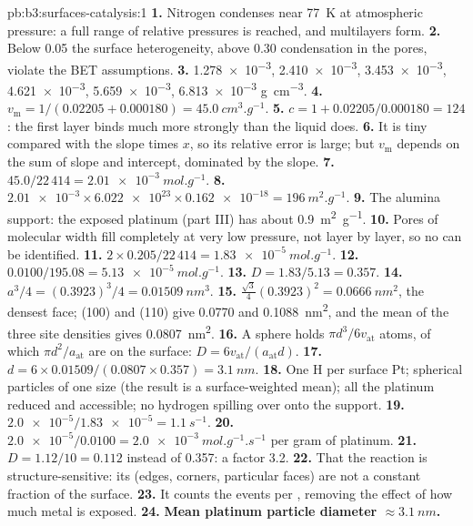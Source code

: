\begin{solution}{pb:b3:surfaces-catalysis:1}
\textbf{1.} Nitrogen condenses near \qty{77}{K} at atmospheric pressure: a full range of
relative pressures is reached, and multilayers form.
\textbf{2.} Below 0.05 the surface heterogeneity, above 0.30 condensation in the
pores, violate the BET assumptions.
\textbf{3.} \num{1.278e-3}, \num{2.410e-3}, \num{3.453e-3}, \num{4.621e-3}, \num{5.659e-3}, \num{6.813e-3} \unit{g.cm^{-3}}.
\textbf{4.} $v_{\mathrm m} = 1/(0.02205 + 0.000180) = \qty{45.0}{cm^3.g^{-1}}$.
\textbf{5.} $c = 1 + 0.02205/0.000180 = 124$: the first layer binds much more strongly than
the liquid does.
\textbf{6.} It is tiny compared with the slope times $x$, so its relative error is large;
but $v_{\mathrm m}$ depends on the sum of slope and intercept, dominated by the slope.
\textbf{7.} $45.0/22\,414 = \qty{2.01e-3}{mol.g^{-1}}$.
\textbf{8.} $\num{2.01e-3} \times \num{6.022e23} \times \num{0.162e-18} = \qty{196}{m^2.g^{-1}}$.
\textbf{9.} The alumina support: the exposed platinum (part III) has about \qty{0.9}{m^2.g^{-1}}.
\textbf{10.} Pores of molecular width fill completely at very low pressure, not layer
by layer, so no  can be identified.
\textbf{11.} $2 \times 0.205/22\,414 = \qty{1.83e-5}{mol.g^{-1}}$.
\textbf{12.} $0.0100/195.08 = \qty{5.13e-5}{mol.g^{-1}}$.
\textbf{13.} $D = 1.83/5.13 = 0.357$.
\textbf{14.} $a^3/4 = (0.3923)^3/4 = \qty{0.01509}{nm^3}$.
\textbf{15.} $\frac{\sqrt3}{4}(0.3923)^2 = \qty{0.0666}{nm^2}$, the densest face; (100) and (110) give 0.0770 and
\qty{0.1088}{nm^2}, and the mean of the three site densities gives \qty{0.0807}{nm^2}.
\textbf{16.} A sphere holds $\pi d^3/6v_{\mathrm{at}}$ atoms, of which $\pi d^2/a_{\mathrm{at}}$ are on the surface:
$D = 6v_{\mathrm{at}}/(a_{\mathrm{at}}d)$.
\textbf{17.} $d = 6 \times 0.01509/(0.0807 \times 0.357) = \qty{3.1}{nm}$.
\textbf{18.} One H per surface Pt; spherical particles of one size (the result is a
surface-weighted mean); all the platinum reduced and accessible; no hydrogen
spilling over onto the support.
\textbf{19.} $\num{2.0e-5}/\num{1.83e-5} = \qty{1.1}{s^{-1}}$.
\textbf{20.} $\num{2.0e-5}/0.0100 = \qty{2.0e-3}{mol.g^{-1}.s^{-1}}$ per gram of platinum.
\textbf{21.} $D = 1.12/10 = 0.112$ instead of 0.357: a factor 3.2.
\textbf{22.} That the reaction is structure-sensitive: its  (edges,
corners, particular faces) are not a constant fraction of the surface.
\textbf{23.} It counts the events per , removing the effect of how much
metal is exposed.
\textbf{24.} \textbf{Mean platinum particle diameter $\approx \qty{3.1}{nm}$.}
\end{solution}
